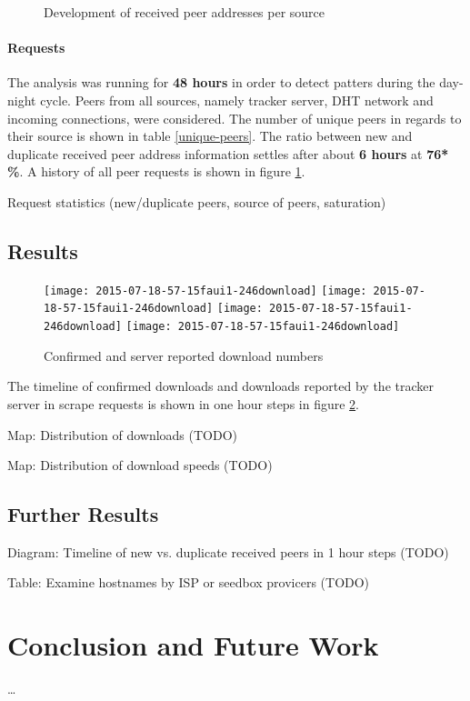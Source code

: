 \documentclass[10pt, a4paper]{scrartcl} %
\renewcommand{\_}{\origunderscore\allowbreak}
\begin{document}
\begin{figure}
\centering
\caption{Development of received peer addresses per source}
\label{request-history}
\end{figure}

\paragraph{Requests}
The analysis was running for \textbf{48 hours} in order to detect patters during the day-night cycle. Peers from all sources, namely tracker server, DHT network and incoming connections, were considered. The number of unique peers in regards to their source is shown in table \ref{unique-peers}. The ratio between new and duplicate received peer address information settles after about \textbf{6 hours} at \textbf{76*\,\%}. A history of all peer requests is shown in figure \ref{request-history}.

Request statistics (new/duplicate peers, source of peers, saturation)

\subsection{Results}
\begin{figure}
\centering
\texttt{[image: 2015-07-18\_21-57-15\_faui1-246\_download]}
\texttt{[image: 2015-07-18\_21-57-15\_faui1-246\_download]}
\texttt{[image: 2015-07-18\_21-57-15\_faui1-246\_download]}
\texttt{[image: 2015-07-18\_21-57-15\_faui1-246\_download]}
\caption{Confirmed and server reported download numbers}
\label{downloads}
\end{figure}

The timeline of confirmed downloads and downloads reported by the tracker server in scrape requests is shown in one hour steps in figure \ref{downloads}.

Map: Distribution of downloads (TODO)

Map: Distribution of download speeds (TODO)

\subsection{Further Results}
Diagram: Timeline of new vs. duplicate received peers in 1 hour steps (TODO)

Table: Examine hostnames by ISP or seedbox provicers (TODO)

\section{Conclusion and Future Work}
\dots
\newpage

\printbibliography[heading=bibintoc]
\end{document}
